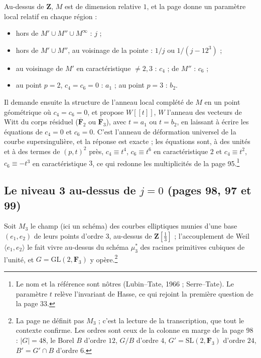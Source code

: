 \documentclass[11pt,a4paper]{article}
\begin{document}
Au-dessus de $\mathbf{Z}$, $M$ est de dimension relative $1$, et la page donne
un paramètre local relatif en chaque région :
\begin{itemize}
\item hors de $M' \cup M'' \cup M^{\infty}$ : $j$ ;
\item hors de $M' \cup M''$, au voisinage de la pointe : $1/j$ ou $1/(j - 12^3)$ ;
\item au voisinage de $M'$ en caractéristique $\neq 2,3$ : $c_4$ ; de $M''$ : $c_6$ ;
\item au point $p = 2$, $c_4 = c_6 = 0$ : $a_1$ ; au point $p = 3$ : $b_2$.
\end{itemize}
Il demande ensuite la structure de l'anneau local complété de $M$ en un point
géométrique où $c_4 = c_6 = 0$, et propose $W[[t]]$, $W$ l'anneau des
vecteurs de Witt du corps résiduel ($\overline{\mathbf{F}}_2$ ou
$\overline{\mathbf{F}}_3$), avec $t = a_1$ ou $t = b_2$, en laissant à écrire
les équations de $c_4 = 0$ et $c_6 = 0$. C'est l'anneau de déformation
universel de la courbe supersingulière, et la réponse est exacte ; les
équations sont, à des unités et à des termes de $(p,t)^2$ près, $c_4 \equiv t^4$,
$c_6 \equiv t^6$ en caractéristique $2$ et $c_4 \equiv t^2$, $c_6 \equiv -t^3$
en caractéristique $3$, ce qui redonne les multiplicités de la page 95.\footnote{Le
nom et la référence sont nôtres (Lubin--Tate, 1966 ; Serre--Tate). Le
paramètre $t$ relève l'invariant de Hasse, ce qui rejoint la première question
de la page 33.}

\subsection*{Le niveau 3 au-dessus de $j = 0$ (pages 98, 97 et 99)}

Soit $M_3$ le champ (ici un schéma) des courbes elliptiques munies d'une
base $(e_1,e_2)$ de leurs points d'ordre $3$, au-dessus de $\mathbf{Z}[\tfrac13]$ ;
l'accouplement de Weil $\langle e_1, e_2\rangle$ le fait vivre au-dessus du
schéma $\mu_3^{*}$ des racines primitives cubiques de l'unité, et $G =
\mathrm{GL}(2,\mathbf{F}_3)$ y opère.\footnote{La page ne définit pas $M_3$ ;
c'est la lecture de la transcription, que tout le contexte confirme. Les
ordres sont ceux de la colonne en marge de la page 98 : $|G| = 48$, le Borel
$B$ d'ordre $12$, $G/B$ d'ordre $4$, $G' = \mathrm{SL}(2,\mathbf{F}_3)$ d'ordre
$24$, $B' = G'\cap B$ d'ordre $6$.}
\end{document}
